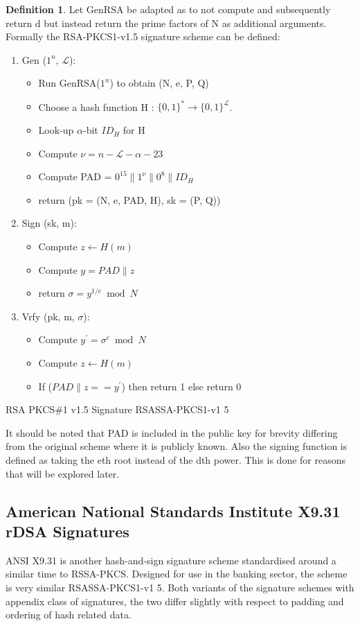 \documentclass[]{final_report}
\theoremstyle{definition}
\newtheorem{definition}{Definition}[chapter]
\begin{document}
\begin{definition}
Let GenRSA be adapted as to not compute and subsequently return d but instead return the prime factors of N as additional arguments. Formally the RSA-PKCS1-v1.5 signature scheme can be defined:
\begin{enumerate}
    \item Gen ($1^n$, $\mathcal{L}$): 
    \begin{itemize}
    \item[] Run GenRSA($1^n$) to obtain (N, e, P, Q)
    \item[] Choose a hash function H : $\{0, 1\}^* \rightarrow \{0, 1\}^\mathcal{L}$.
    \item[] Look-up $\alpha$-bit $ID_{H}$ for H
    \item[] Compute $\nu = n - \mathcal{L} - \alpha - 23$
    \item[] Compute PAD = $0^{15} \| 1^{\nu} \| 0^8 \| ID_{H}$
    \item[] return (pk = (N, e, PAD, H), sk = (P, Q))
    \end{itemize}

    \item Sign (sk, m):
    \begin{itemize}
    \item[] Compute $z \leftarrow H(m)$
    \item[] Compute $y = PAD  \| z$
    \item[] return $\sigma = y^{1/e} \bmod N$
    \end{itemize}
   
    \item Vrfy (pk, m, $\sigma$):  
    \begin{itemize}
    \item[] Compute $y^{'} = \sigma^{e} \bmod N$
    \item[] Compute $z \leftarrow H(m)$
    \item[] If ($PAD \| z == y^{'}$) then return 1 else return 0
    \end{itemize}
\end{enumerate}
RSA PKCS\#1 v1.5 Signature RSASSA-PKCS1-v1 5
\end{definition}
It should be noted that PAD is included in the public key for brevity differing from the original scheme where it is publicly known. Also the signing function is defined as taking the eth root instead of the dth power. This is done for reasons that will be explored later.

\subsection{American National Standards Institute X9.31 rDSA Signatures}
ANSI X9.31 is another hash-and-sign signature scheme standardised around a similar time to RSSA-PKCS. Designed for use in the banking sector, the scheme is very similar RSASSA-PKCS1-v1 5. Both variants of the signature schemes with appendix class of signatures, the two differ slightly with respect to padding and ordering of hash related data.
\end{document}
